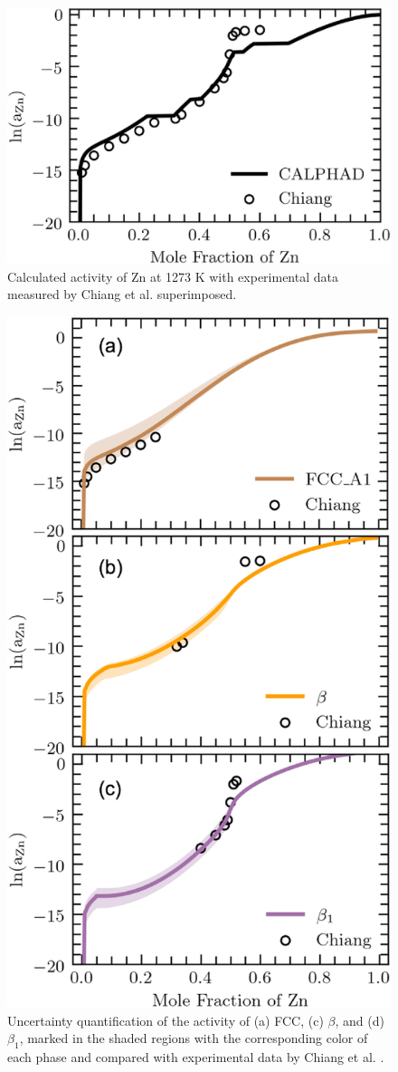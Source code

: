 \begin{figure}[H]
    \centering
    \includegraphics[width=0.5\linewidth]{intermetallics/Intermetallics-PdZnACR.jpg}
    \caption{Calculated activity of Zn at 1273 K with experimental data measured by Chiang et al. \cite{ChiangIpserChang1977} superimposed.}
    \label{intermetallics:fig:PdZnACR}
\end{figure}

\begin{figure}[H]
    \centering
    \includegraphics[width=0.5\linewidth]{intermetallics/Intermetallics-PdZnACRUQ.jpg}
    \caption{Uncertainty quantification of the activity of (a) FCC, (c) $\beta$, and (d) $\beta_1$, marked in the shaded regions with the corresponding color of each phase and compared with experimental data by Chiang et al. \cite{ChiangIpserChang1977}.}
    \label{intermetallics:fig:PdZnACRUQ}
\end{figure}

